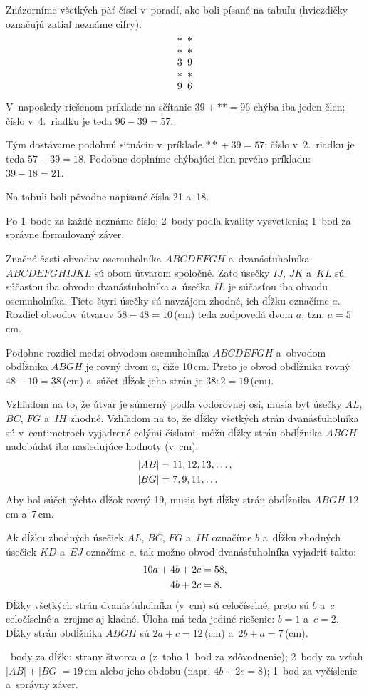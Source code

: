 {%
Znázorníme všetkých päť čísel v~poradí, ako boli písané na tabuľu
(hviezdičky označujú zatiaľ neznáme cifry):
$$
\vbox{\let\\=\cr
\halign{&\hbox to1.0em{\hss$#$\hss}\cr
*&*\\*&*\\3&9\\*&*\\9&6\\}}
$$

V~naposledy riešenom príklade na sčítanie $39+**=96$ chýba iba jeden člen; číslo v~4.~riadku je teda $96-39=57$.

Tým dostávame podobnú situáciu v~príklade ${**}+39=57$; číslo v~2.~riadku je teda $57-39=18$.
Podobne doplníme chýbajúci člen prvého príkladu: $39-18=21$.

Na tabuli boli pôvodne napísané čísla 21 a~18.

\hodnotenie
Po 1~bode za každé neznáme číslo;
2~body podľa kvality vysvetlenia;
1~bod za správne formulovaný záver.
\endhodnotenie
}

{%
Značné časti obvodov osemuholníka $ABCDEFGH$ a~dvanásťuholníka $ABCDEFGHIJKL$ sú obom útvarom spoločné.
Zato úsečky $IJ$, $JK$ a~$KL$ sú súčasťou iba obvodu dvanásťuholníka a~úsečka $IL$ je súčasťou iba obvodu osemuholníka.
Tieto štyri úsečky sú navzájom zhodné, ich dĺžku označíme $a$.
Rozdiel obvodov útvarov ${58-48}=10$\,(cm) teda zodpovedá dvom $a$; tzn. $a=5$\,cm.

Podobne rozdiel medzi obvodom osemuholníka $ABCDEFGH$ a~obvodom obdĺžnika $ABGH$ je rovný dvom $a$, čiže 10\,cm.
Preto je obvod obdĺžnika rovný $48-10=38$\,(cm) a~súčet dĺžok jeho strán je $38:2=19$\,(cm).

Vzhľadom na to, že útvar je súmerný podľa vodorovnej osi, musia byť úsečky $AL$, $BC$, $FG$ a~$IH$ zhodné.
Vzhľadom na to, že dĺžky všetkých strán dvanásťuholníka sú v~centimetroch vyjadrené celými číslami, môžu dĺžky strán obdĺžnika $ABGH$ nadobúdať iba nasledujúce hodnoty (v~cm):
$$
\aligned
\vert AB\vert&=11,12,13,\dots, \\
\vert BG\vert&=7,9,11,\dots
\endaligned
$$
Aby bol súčet týchto dĺžok rovný 19, musia byť dĺžky strán obdĺžnika $ABGH$ 12\,cm a~7\,cm.

\poznamka
Ak dĺžku zhodných úsečiek $AL$, $BC$, $FG$ a~$IH$ označíme $b$ a~dĺžku zhodných úsečiek $KD$ a~$EJ$ označíme $c$, tak možno obvod dvanásťuholníka vyjadriť takto:
$$
\aligned
10a+4b+2c&=58, \\
4b+2c&=8.
\endaligned
$$
Dĺžky všetkých strán dvanásťuholníka (v~cm) sú celočíselné, preto sú $b$ a~$c$ celočíselné a~zrejme aj kladné.
Úloha má teda jediné riešenie: $b=1$ a~$c=2$.
Dĺžky strán obdĺžnika $ABGH$ sú $2a+c=12$\,(cm) a~$2b+a=7$\,(cm).
%


~body za dĺžku strany štvorca $a$ (z~toho 1~bod za zdôvodnenie);
2~body za vzťah $|AB|+|BG|=19$\,cm alebo jeho obdobu (napr. $4b+2c=8$);
1~bod za vyčíslenie a~správny záver.
\endhodnotenie
}

